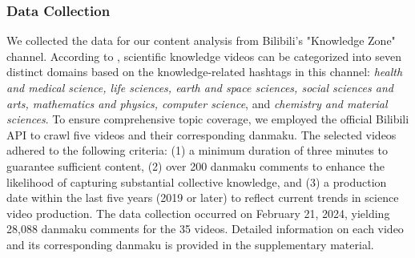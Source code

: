 \subsubsection{Data Collection}
We collected the data for our content analysis from Bilibili's "Knowledge Zone" channel. 
According to \cite{zhang2023understanding, he2024engage}, scientific knowledge videos can be categorized into seven distinct domains based on the knowledge-related hashtags in this channel: \textit{health and medical science, life sciences, earth and space sciences, social sciences and arts, mathematics and physics, computer science}, and \textit{chemistry and material sciences}.
To ensure comprehensive topic coverage, we employed the official Bilibili API to crawl five videos and their corresponding danmaku. The selected videos adhered to the following criteria: (1) a minimum duration of three minutes to guarantee sufficient content, (2) over 200 danmaku comments to enhance the likelihood of capturing substantial collective knowledge, and (3) a production date within the last five years (2019 or later) to reflect current trends in science video production. The data collection occurred on February 21, 2024, yielding 28,088 danmaku comments for the 35 videos. Detailed information on each video and its corresponding danmaku is provided in the supplementary material. 

